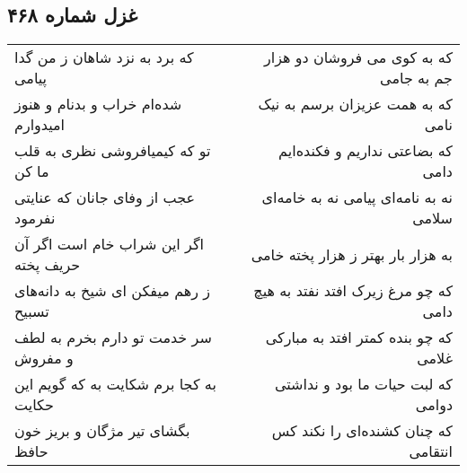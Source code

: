 \begin{center}
\section*{غزل شماره ۴۶۸}
\label{sec:sh468}
\begin{longtable}{l p{0.5cm} r}
که برد به نزد شاهان ز من گدا پیامی
&&
که به کوی می فروشان دو هزار جم به جامی
\\
شده‌ام خراب و بدنام و هنوز امیدوارم
&&
که به همت عزیزان برسم به نیک نامی
\\
تو که کیمیافروشی نظری به قلب ما کن
&&
که بضاعتی نداریم و فکنده‌ایم دامی
\\
عجب از وفای جانان که عنایتی نفرمود
&&
نه به نامه‌ای پیامی نه به خامه‌ای سلامی
\\
اگر این شراب خام است اگر آن حریف پخته
&&
به هزار بار بهتر ز هزار پخته خامی
\\
ز رهم میفکن ای شیخ به دانه‌های تسبیح
&&
که چو مرغ زیرک افتد نفتد به هیچ دامی
\\
سر خدمت تو دارم بخرم به لطف و مفروش
&&
که چو بنده کمتر افتد به مبارکی غلامی
\\
به کجا برم شکایت به که گویم این حکایت
&&
که لبت حیات ما بود و نداشتی دوامی
\\
بگشای تیر مژگان و بریز خون حافظ
&&
که چنان کشنده‌ای را نکند کس انتقامی
\\
\end{longtable}
\end{center}
